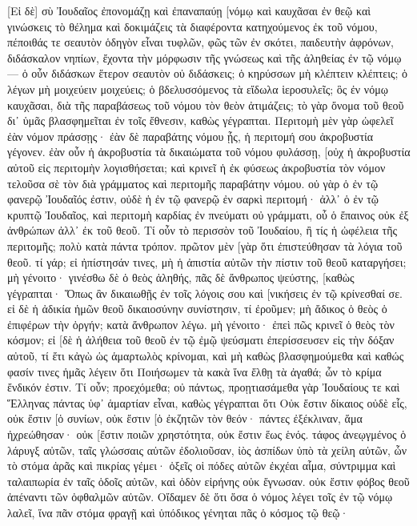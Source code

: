 [Εἰ δὲ] σὺ Ἰουδαῖος ἐπονομάζῃ καὶ ἐπαναπαύῃ [νόμῳ καὶ καυχᾶσαι ἐν θεῷ 
καὶ γινώσκεις τὸ θέλημα καὶ δοκιμάζεις τὰ διαφέροντα κατηχούμενος ἐκ τοῦ νόμου, 
πέποιθάς τε σεαυτὸν ὁδηγὸν εἶναι τυφλῶν, φῶς τῶν ἐν σκότει, 
παιδευτὴν ἀφρόνων, διδάσκαλον νηπίων, ἔχοντα τὴν μόρφωσιν τῆς γνώσεως καὶ τῆς ἀληθείας ἐν τῷ νόμῳ— 
ὁ οὖν διδάσκων ἕτερον σεαυτὸν οὐ διδάσκεις; ὁ κηρύσσων μὴ κλέπτειν κλέπτεις; 
ὁ λέγων μὴ μοιχεύειν μοιχεύεις; ὁ βδελυσσόμενος τὰ εἴδωλα ἱεροσυλεῖς; 
ὃς ἐν νόμῳ καυχᾶσαι, διὰ τῆς παραβάσεως τοῦ νόμου τὸν θεὸν ἀτιμάζεις; 
τὸ γὰρ ὄνομα τοῦ θεοῦ δι᾽ ὑμᾶς βλασφημεῖται ἐν τοῖς ἔθνεσιν, καθὼς γέγραπται. 
Περιτομὴ μὲν γὰρ ὠφελεῖ ἐὰν νόμον πράσσῃς· ἐὰν δὲ παραβάτης νόμου ᾖς, ἡ περιτομή σου ἀκροβυστία γέγονεν. 
ἐὰν οὖν ἡ ἀκροβυστία τὰ δικαιώματα τοῦ νόμου φυλάσσῃ, [οὐχ ἡ ἀκροβυστία αὐτοῦ εἰς περιτομὴν λογισθήσεται; 
καὶ κρινεῖ ἡ ἐκ φύσεως ἀκροβυστία τὸν νόμον τελοῦσα σὲ τὸν διὰ γράμματος καὶ περιτομῆς παραβάτην νόμου. 
οὐ γὰρ ὁ ἐν τῷ φανερῷ Ἰουδαῖός ἐστιν, οὐδὲ ἡ ἐν τῷ φανερῷ ἐν σαρκὶ περιτομή· 
ἀλλ᾽ ὁ ἐν τῷ κρυπτῷ Ἰουδαῖος, καὶ περιτομὴ καρδίας ἐν πνεύματι οὐ γράμματι, οὗ ὁ ἔπαινος οὐκ ἐξ ἀνθρώπων ἀλλ᾽ ἐκ τοῦ θεοῦ. 
Τί οὖν τὸ περισσὸν τοῦ Ἰουδαίου, ἢ τίς ἡ ὠφέλεια τῆς περιτομῆς; 
πολὺ κατὰ πάντα τρόπον. πρῶτον μὲν [γὰρ ὅτι ἐπιστεύθησαν τὰ λόγια τοῦ θεοῦ. 
τί γάρ; εἰ ἠπίστησάν τινες, μὴ ἡ ἀπιστία αὐτῶν τὴν πίστιν τοῦ θεοῦ καταργήσει; 
μὴ γένοιτο· γινέσθω δὲ ὁ θεὸς ἀληθής, πᾶς δὲ ἄνθρωπος ψεύστης, [καθὼς γέγραπται· Ὅπως ἂν δικαιωθῇς ἐν τοῖς λόγοις σου καὶ [νικήσεις ἐν τῷ κρίνεσθαί σε. 
εἰ δὲ ἡ ἀδικία ἡμῶν θεοῦ δικαιοσύνην συνίστησιν, τί ἐροῦμεν; μὴ ἄδικος ὁ θεὸς ὁ ἐπιφέρων τὴν ὀργήν; κατὰ ἄνθρωπον λέγω. 
μὴ γένοιτο· ἐπεὶ πῶς κρινεῖ ὁ θεὸς τὸν κόσμον; 
εἰ [δὲ ἡ ἀλήθεια τοῦ θεοῦ ἐν τῷ ἐμῷ ψεύσματι ἐπερίσσευσεν εἰς τὴν δόξαν αὐτοῦ, τί ἔτι κἀγὼ ὡς ἁμαρτωλὸς κρίνομαι, 
καὶ μὴ καθὼς βλασφημούμεθα καὶ καθώς φασίν τινες ἡμᾶς λέγειν ὅτι Ποιήσωμεν τὰ κακὰ ἵνα ἔλθῃ τὰ ἀγαθά; ὧν τὸ κρίμα ἔνδικόν ἐστιν. 
Τί οὖν; προεχόμεθα; οὐ πάντως, προῃτιασάμεθα γὰρ Ἰουδαίους τε καὶ Ἕλληνας πάντας ὑφ᾽ ἁμαρτίαν εἶναι, 
καθὼς γέγραπται ὅτι Οὐκ ἔστιν δίκαιος οὐδὲ εἷς, 
οὐκ ἔστιν [ὁ συνίων, οὐκ ἔστιν [ὁ ἐκζητῶν τὸν θεόν· 
πάντες ἐξέκλιναν, ἅμα ἠχρεώθησαν· οὐκ [ἔστιν ποιῶν χρηστότητα, οὐκ ἔστιν ἕως ἑνός. 
τάφος ἀνεῳγμένος ὁ λάρυγξ αὐτῶν, ταῖς γλώσσαις αὐτῶν ἐδολιοῦσαν, ἰὸς ἀσπίδων ὑπὸ τὰ χείλη αὐτῶν, 
ὧν τὸ στόμα ἀρᾶς καὶ πικρίας γέμει· 
ὀξεῖς οἱ πόδες αὐτῶν ἐκχέαι αἷμα, 
σύντριμμα καὶ ταλαιπωρία ἐν ταῖς ὁδοῖς αὐτῶν, 
καὶ ὁδὸν εἰρήνης οὐκ ἔγνωσαν. 
οὐκ ἔστιν φόβος θεοῦ ἀπέναντι τῶν ὀφθαλμῶν αὐτῶν. 
Οἴδαμεν δὲ ὅτι ὅσα ὁ νόμος λέγει τοῖς ἐν τῷ νόμῳ λαλεῖ, ἵνα πᾶν στόμα φραγῇ καὶ ὑπόδικος γένηται πᾶς ὁ κόσμος τῷ θεῷ· 
